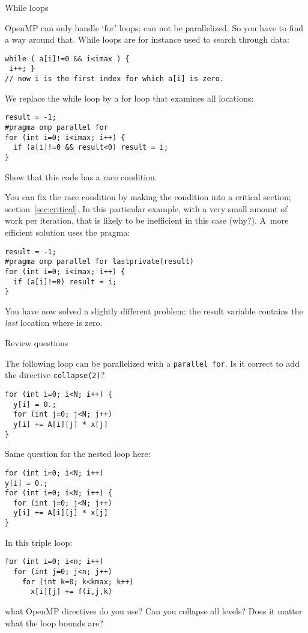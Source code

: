  {While loops}

OpenMP can only handle `for' loops:  can not
be parallelized. So you have to find a way around that. While loops
are for instance used to search through data:
\begin{lstlisting}
while ( a[i]!=0 && i<imax ) {
 i++; }
// now i is the first index for which a[i] is zero.
\end{lstlisting}
We replace the while loop by a for loop that examines all locations:
\begin{lstlisting}
result = -1;
#pragma omp parallel for
for (int i=0; i<imax; i++) {
  if (a[i]!=0 && result<0) result = i;
}
\end{lstlisting}
\begin{exercise}
  Show that this code has a race condition.
\end{exercise}
You can fix the race condition by making the condition into a critical section;
section~\ref{sec:critical}. In this particular example, with a very small amount
of work per iteration, that is likely to be inefficient 
in this case (why?).
A~more efficient solution uses the  pragma:
\begin{lstlisting}
result = -1;
#pragma omp parallel for lastprivate(result)
for (int i=0; i<imax; i++) {
  if (a[i]!=0) result = i;
}
\end{lstlisting}
You have now solved a slightly different problem: the result variable
contains the \emph{last} location where  is zero.

 {Review questions}

\begin{exercise}
  The following loop can be parallelized with a \lstinline+parallel for+.
  Is it correct to add the directive \lstinline+collapse(2)+?

\begin{lstlisting}
for (int i=0; i<N; i++) {
  y[i] = 0.;
  for (int j=0; j<N; j++)
  y[i] += A[i][j] * x[j]
}
\end{lstlisting}
\end{exercise}

\begin{exercise}
  Same question for the nested loop here:

\begin{lstlisting}
for (int i=0; i<N; i++)
y[i] = 0.;
for (int i=0; i<N; i++) {
  for (int j=0; j<N; j++)
  y[i] += A[i][j] * x[j]
}
\end{lstlisting}
\end{exercise}

\begin{exercise}
  In this triple loop:
\begin{lstlisting}
for (int i=0; i<n; i++)
  for (int j=0; j<n; j++)
    for (int k=0; k<kmax; k++)
      x[i][j] += f(i,j,k)
\end{lstlisting}
what OpenMP directives do you use?
Can you collapse all levels?
Does it matter what the loop bounds are?
\end{exercise}
